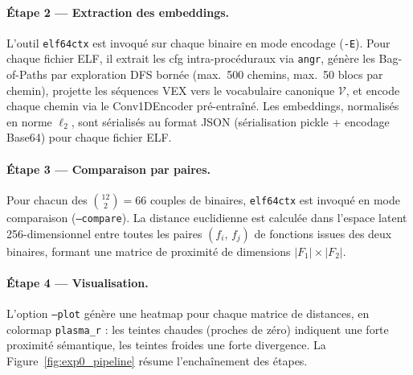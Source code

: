 \paragraph{Étape 2 — Extraction des embeddings.}
L'outil \texttt{elf64ctx} est invoqué sur chaque binaire en mode encodage
(\texttt{-E}). Pour chaque fichier ELF, il extrait les \gls{cfg}
intra-procéduraux via \texttt{angr}, génère les
Bag-of-Paths par exploration DFS bornée (max.\ 500 chemins, max.\ 50 blocs
par chemin), projette les séquences VEX vers le vocabulaire canonique
$\mathcal{V}$, et encode chaque chemin via le Conv1DEncoder pré-entraîné. Les
embeddings, normalisés en norme $\ell_2$, sont sérialisés au format JSON
(sérialisation pickle + encodage Base64) pour chaque fichier ELF.

\paragraph{Étape 3 — Comparaison par paires.}
Pour chacun des $\binom{12}{2} = 66$ couples de binaires, \texttt{elf64ctx}
est invoqué en mode comparaison (\texttt{--compare}). La distance euclidienne
est calculée dans l'espace latent 256-dimensionnel entre toutes les paires
$(f_i,\,f_j)$ de fonctions issues des deux binaires, formant une matrice de
proximité de dimensions $|F_1| \times |F_2|$.

\paragraph{Étape 4 — Visualisation.}
L'option \texttt{--plot} génère une heatmap pour chaque matrice de distances,
en colormap \texttt{plasma\_r} : les teintes chaudes (proches de zéro)
indiquent une forte proximité sémantique, les teintes froides une forte
divergence. La Figure~\ref{fig:exp0_pipeline} résume l'enchaînement des étapes.

